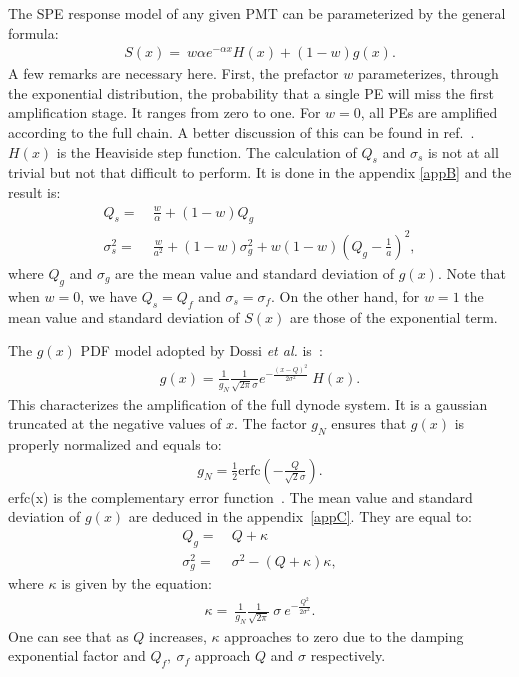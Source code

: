 \documentclass[a4paper,11pt]{article}
\begin{document}
 The SPE response model of any given PMT can be parameterized by the general formula:
 \begin{align}
S(x) =    \ w \alpha e^{-\alpha x } H(x) + (1-w)g(x). \label{eq:S}
\end{align}
A few remarks are necessary here. 
First, the prefactor $w$ parameterizes, through the exponential distribution, the probability that a single PE will miss the first amplification stage. 
It ranges from zero to one. For $w=0$, all PEs are amplified according to the full chain. 
A better discussion of this can be found in ref.~\cite{dossi}. 
$H(x)$ is the Heaviside step function.  
The calculation of $Q_s$ and $\sigma_s$ is not at all trivial but not that difficult to perform. 
It is done in the appendix \ref{appB} and the result is:
\begin{align}
Q_s = & \ \frac{w}{\alpha} + (1-w)Q_g \label{eq:qs} \\ 
\sigma_s^2       = & \ \frac{w}{a^2} +(1-w)\sigma_g^2 + w(1-w)\left( Q_g -\frac{1}{a} \right)^2,
\end{align}
where $Q_g$ and $\sigma_g$ are the mean value and standard deviation of $g(x)$.
Note that when $w=0$, we have $Q_s=Q_f$ and $\sigma_s=\sigma_f$. 
On the other hand, for $w=1$ the mean value and standard deviation of $S(x)$ are those of the exponential term.  

 The $g(x)$ PDF model adopted by Dossi \emph{et al.} is~\cite{dossi}:
\begin{align}
g(x) =    \frac{1}{g_N} \frac{1}{\sqrt{2\pi}\sigma} e^{ - \frac{( x - Q )^2}{2\sigma^2}} \ H(x). \label{eq:g}
\end{align}
This characterizes the amplification of the full dynode system. 
It is a gaussian truncated at the negative values of $x$. 
The factor $g_N$ ensures that $g(x)$ is properly normalized and equals to: 
\begin{align}
g_N =  \frac{1}{2} \text{erfc} \left( -\frac{Q}{\sqrt{2}\sigma } \right).
\end{align}
erfc(x) is the complementary error function~\cite{error}. 
The mean value and standard deviation of $g(x)$ are deduced in the appendix~\ref{appC}. 
They are equal to:
\begin{align}
Q_g = & \  Q + \kappa       \label{eq:qg}         \\
\sigma_g^2       = & \  \sigma^2 - ( Q + \kappa )\kappa ,      
\end{align}
where $\kappa$ is given by the equation:
\begin{align}
 \kappa = \  \frac{1}{g_N} \frac{1}{\sqrt{2\pi}} \  \sigma \ e^{ - \frac{Q^2}{2\sigma^2}}. 
\end{align} 
One can see that as $Q$ increases, $\kappa$ approaches to zero due  to the damping exponential factor and $Q_f, \ \sigma_f$ approach $Q$ and $\sigma$ respectively.  
\end{document}
